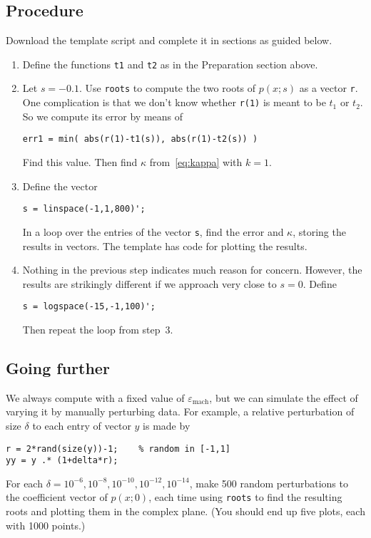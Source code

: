 \documentclass[11pt]{article}
\begin{document}
\subsection*{Procedure}

Download the template script and complete it in sections as guided below.

\begin{enumerate}
\item Define the functions \texttt{t1} and \texttt{t2} as in the Preparation section above.

\item Let $s=-0.1$. Use \texttt{roots} to compute the two roots of $p(x;s)$ as a vector \texttt{r}. One complication is that we don't know whether \texttt{r(1)} is meant to be $t_1$ or $t_2$. So we compute its error by means of
\begin{verbatim}
err1 = min( abs(r(1)-t1(s)), abs(r(1)-t2(s)) )
\end{verbatim}
  Find this value. Then find $\kappa$ from~\eqref{eq:kappa} with $k=1$.

\item Define the vector
\begin{verbatim}
s = linspace(-1,1,800)';
\end{verbatim}
  In a loop over the entries of the vector \texttt{s}, find the error and $\kappa$, storing the results in vectors. The template has code for plotting the results. 

\item Nothing in the previous step indicates much reason for concern. However, the results are strikingly different if we approach very close to $s=0$. Define 
\begin{verbatim}
s = logspace(-15,-1,100)';
\end{verbatim}
Then repeat the loop from step~3. 
\end{enumerate}

\subsection*{Going further}

We always compute with a fixed value of $\varepsilon_{\text{mach}}$, but we can simulate the effect of varying it by manually perturbing data. For example, a relative perturbation of size $\delta$ to each entry of vector $y$ is made by
\begin{verbatim}
r = 2*rand(size(y))-1;    % random in [-1,1]
yy = y .* (1+delta*r);
\end{verbatim}
For each $\delta=10^{-6},10^{-8},10^{-10},10^{-12},10^{-14}$, make 500 random perturbations to the coefficient vector of $p(x;0)$, each time using \texttt{roots} to find the resulting roots and plotting them in the complex plane. (You should end up five plots, each with 1000 points.) 
\end{document}
